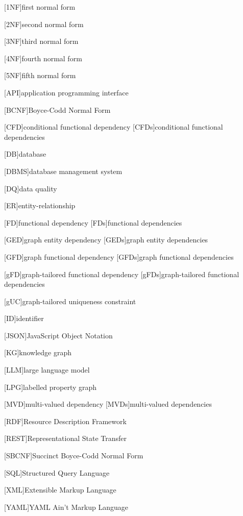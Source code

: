 \begin{acronym}

[1NF]{first normal form}

[2NF]{second normal form}

[3NF]{third normal form}

[4NF]{fourth normal form}

[5NF]{fifth normal form}

[API]{application programming interface}

[BCNF]{Boyce-Codd Normal Form}

[CFD]{conditional functional dependency}
[CFDs]{conditional functional dependencies}

[DB]{database}

[DBMS]{database management system}

[DQ]{data quality}

[ER]{entity-relationship}

[FD]{functional dependency}
[FDs]{functional dependencies}

[GED]{graph entity dependency}
[GEDs]{graph entity dependencies}


[GFD]{graph functional dependency}
[GFDs]{graph functional dependencies}

[gFD]{graph-tailored functional dependency}
[gFDs]{graph-tailored functional dependencies}

[gUC]{graph-tailored uniqueness constraint}

[ID]{identifier}

[JSON]{JavaScript Object Notation}

[KG]{knowledge graph}

[LLM]{large language model}

[LPG]{labelled property graph}

[MVD]{multi-valued dependency}
[MVDs]{multi-valued dependencies}

[RDF]{Resource Description Framework}

[REST]{Representational State Transfer}

[SBCNF]{Succinct Boyce-Codd Normal Form} %

[SQL]{Structured Query Language}

[XML]{Extensible Markup Language}

[YAML]{YAML Ain't Markup Language}

\end{acronym}

